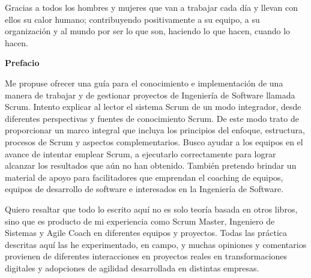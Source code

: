 
%

\newpage

\hspace{1cm}\newline %
\vspace{5cm} %

\begin{center}
Gracias a todos los hombres y mujeres que van a trabajar cada día y llevan con ellos su calor humano; contribuyendo positivamente a su equipo, a su organización y al mundo por ser lo que son, haciendo lo que hacen, cuando lo hacen.
\end{center}

\newpage
\vspace{2cm} %
\hspace{1cm}\newline %

%

\newpage

{\large \textbf{Prefacio}}

\vspace{2cm} %

Me propuse ofrecer una guía para el conocimiento e implementación de una manera de trabajar y de gestionar proyectos de Ingeniería de Software llamada Scrum. Intento explicar al lector el sistema Scrum de un modo integrador, desde diferentes perspectivas y fuentes de conocimiento Scrum. De este modo trato de proporcionar un marco integral que incluya los principios del enfoque, estructura, procesos de Scrum y aspectos complementarios. Busco ayudar a los equipos en el avance de intentar emplear Scrum, a ejecutarlo correctamente para lograr alcanzar los resultados que aún no han obtenido. También pretendo brindar un material de apoyo para facilitadores que emprendan el coaching de equipos, equipos de desarrollo de software e interesados en la Ingeniería de Software.

Quiero resaltar que todo lo escrito aquí no es solo teoría basada en otros libros, sino que es producto de mi experiencia como Scrum Master, Ingeniero de Sistemas y Agile Coach en diferentes equipos y proyectos. Todas las práctica descritas aquí las he experimentado, en campo, y muchas opiniones y comentarios provienen de diferentes interacciones en proyectos reales en transformaciones digitales y adopciones de agilidad desarrollada en distintas empresas.

\newpage
\vspace{2cm} %
\hspace{1cm}\newline %
 

